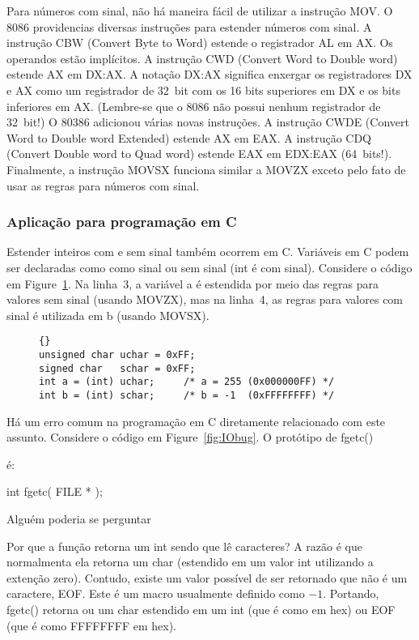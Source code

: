 Para números com sinal, não há maneira fácil de utilizar a instrução {\code MOV}. 
O 8086 providencias diversas instruções para estender
números com sinal.  A instrução {\code CBW}  (Convert Byte to
Word) estende o registrador AL em AX. Os operandos
estão implícitos. A instrução {\code CWD}  (Convert Word to Double
word) estende AX em DX:AX. A notação DX:AX significa
enxergar os registradores DX e AX como um registrador de 32~bit com os
 16 bits superiores em DX e os bits inferiores em AX. (Lembre-se que o 8086
não possui nenhum registrador de 32~bit!) O 80386 adicionou várias novas
instruções. A instrução {\code CWDE}  (Convert Word to Double
word Extended) estende AX em EAX. A instrução {\code CDQ}
 (Convert Double word to Quad word) 
estende EAX em EDX:EAX (64~bits!). Finalmente, a
instrução {\code MOVSX}  funciona similar a {\code MOVZX}
exceto pelo fato de usar as regras para números com sinal.

\subsubsection{Aplicação para programação em C}

Estender  inteiros com e sem sinal também ocorrem
em C. Variáveis em C podem ser declaradas como como sinal ou sem sinal
({\code int} é com sinal). Considere o código em 
Figure~\ref{fig:charExt}.  Na linha~3, a variável {\code a} é
estendida por meio das regras para valores sem sinal (usando {\code MOVZX}), mas na 
linha~4, as regras para valores com sinal é utilizada em {\code b} (usando {\code MOVSX}).

\begin{figure}[t]
\begin{lstlisting}[frame=tlrb]{}
unsigned char uchar = 0xFF;
signed char   schar = 0xFF;
int a = (int) uchar;     /* a = 255 (0x000000FF) */
int b = (int) schar;     /* b = -1  (0xFFFFFFFF) */
\end{lstlisting}
\caption{}
\label{fig:charExt}
\end{figure}

Há um erro comum na programação em C diretamente relacionado com este assunto.
Considere o código em Figure~\ref{fig:IObug}. O protótipo de 
{\code fgetc()}{\samepage é:
\begin{CodeQuote}
int fgetc( FILE * );
\end{CodeQuote}
Alguém poderia se perguntar }Por que a função retorna um {\code int}
sendo que lê caracteres? A razão é que normalmenta ela retorna
um {\code char} (estendido em um valor {\code int} utilizando a extenção
zero). Contudo, existe um valor possível de ser retornado que não é
um caractere, {\code EOF}. Este é um macro usualmente definido como 
$-1$. Portando, {\code fgetc()} retorna ou um {\code char}
estendido em um {\code int} (que é como {} em hex) ou {\code EOF} (que é como {\code FFFFFFFF} em
hex).


